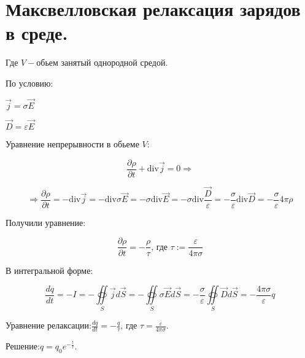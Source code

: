 \section{Максвелловская релаксация зарядов в среде.}
 


Где $V-$обьем занятый однородной средой.

По условию:

\(  \vec{j}=\sigma\vec{E}\)

\( \vec{D}=\varepsilon\vec{E} \) 

Уравнение непрерывности в обьеме $V$:

\[\frac{\partial\rho}{\partial t} +\mathrm{div}\vec{j}=0 \Rightarrow \]

\[\Rightarrow\frac{\partial\rho}{\partial t} =-\mathrm{div}\vec{j}=-\mathrm{div}\sigma\vec{E}=-\sigma \mathrm{div}\vec{E}=-\sigma \mathrm{div} \frac{\vec{D}}{\varepsilon}=-\frac{\sigma}{\varepsilon} \mathrm{div}\vec{D}=-\frac{\sigma}{\varepsilon}4\pi\rho   \]

Получили уравнение:

\[\frac{\partial \rho}{\partial t}=-\frac{\rho}{\tau} \text{, где }\tau:=\frac{\varepsilon}{4\pi\sigma}   \]

В интегральной форме:

\[\frac{dq}{dt}=-I=-\underset{S}{\oiint}\vec{j}d\vec{S}=-\underset{S}{\oiint}\sigma\vec{E}d\vec{S}= -\frac{\sigma}{\varepsilon}\underset{S}{\oiint}\vec{D}d\vec{S}=-\frac{4\pi \sigma}{\varepsilon}q  \]

Уравнение релаксации:$\boxed{ \frac{dq}{dt}=-\frac{q}{\tau} }\text{, где }\tau= \frac{\varepsilon}{4\pi\sigma}.$

Решение:$q=q_0e^{-\frac{t}{\tau}}.$

